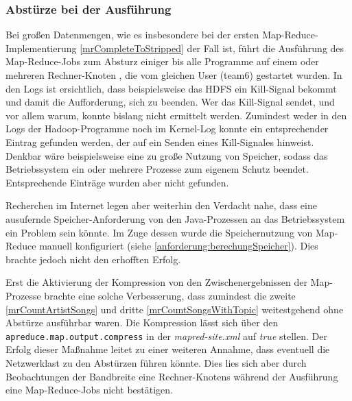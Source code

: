 \subsubsection{Abstürze bei der Ausführung}
Bei großen Datenmengen, wie es insbesondere bei der ersten Map-Reduce-Implementierung \ref{mrCompleteToStripped} der Fall ist,
führt die Ausführung des Map-Reduce-Jobs zum Absturz einiger bis alle Programme auf einem oder mehreren Rechner-Knoten
, die vom gleichen User (team6) gestartet wurden.
In den Logs ist ersichtlich, dass beispielsweise das HDFS ein Kill-Signal bekommt und damit die Aufforderung, sich zu beenden.
Wer das Kill-Signal sendet, und vor allem warum, konnte bislang nicht ermittelt werden. Zumindest weder in den Logs der 
Hadoop-Programme noch im Kernel-Log konnte ein entsprechender Eintrag gefunden werden, der auf ein Senden eines
Kill-Signales hinweist. Denkbar wäre beispielsweise eine zu große Nutzung von Speicher, sodass das Betriebssystem ein
oder mehrere Prozesse zum eigenem Schutz beendet. Entsprechende Einträge wurden aber nicht gefunden.

Recherchen im Internet legen aber weiterhin den Verdacht nahe, dass eine ausufernde Speicher-Anforderung von den Java-Prozessen
an das Betriebssystem ein Problem sein könnte. Im Zuge dessen wurde die Speichernutzung von Map-Reduce manuell konfiguriert 
(siehe \ref{anforderung:berechungSpeicher}). Dies brachte jedoch nicht den erhofften Erfolg.

Erst die Aktivierung der Kompression von den Zwischenergebnissen der Map-Prozesse brachte eine solche Verbesserung, dass zumindest
die zweite \ref{mrCountArtistSongs} und dritte \ref{mrCountSongsWithTopic} weitestgehend ohne Abstürze ausführbar waren. Die Kompression
lässt sich über den \texttt{apreduce.map.output.compress} in der \textit{mapred-site.xml} auf \textit{true} stellen.
Der Erfolg dieser Maßnahme leitet zu einer weiteren Annahme, dass eventuell die Netzwerklast zu den Abstürzen führen
könnte. Dies lies sich aber durch Beobachtungen der Bandbreite eine Rechner-Knotens während der Ausführung
eine Map-Reduce-Jobs nicht bestätigen.
